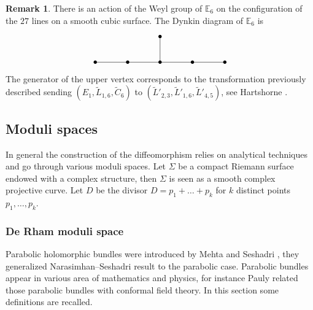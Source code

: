 \documentclass[JEP,XML,SOM,NoEqCountersInSection,Unicode,published]{cedram}
\theoremstyle{definition}
\newtheorem{remark}[definition]{Remark}
\theoremstyle{plain}
\begin{document}
\begin{remark}
There is an action of the Weyl group of $\mathbb{E}_6$ on the configuration of the $27$ lines on a smooth cubic surface. The Dynkin diagram of $\mathbb{E}_6$ is
\[\begin{tikzcd}[scale=.8]
	&& \bullet \\
	\bullet & \bullet & \bullet & \bullet & \bullet
	\arrow[no head, from=2-1, to=2-2, start anchor=center, end anchor = center ]
	\arrow[no head, from=2-3, to=2-4,start anchor=center, end anchor = center ]
	\arrow[no head, from=2-4, to=2-5,start anchor=center, end anchor = center ]
	\arrow[no head, from=1-3, to=2-3,start anchor=center, end anchor = center ]
	\arrow[no head, from=2-2, to=2-3,start anchor=center, end anchor = center ]
\end{tikzcd}
\]
The generator of the upper vertex corresponds to the transformation previously described sending $(E_1, \widetilde{L}_{1,6},\widetilde{C}_6) $ to $(\widetilde{L}'_{2,3},\widetilde{L}'_{1,6},\widetilde{L}'_{4,5})$, see Hartshorne \cite[V, Exer.\,4.11]{Hartshorne}.
\end{remark}

\subsection{Moduli spaces}\label{sect_moduli_spaces}

In general the construction of the diffeomorphism relies on analytical techniques and go through various moduli spaces. Let $\Sigma$ be a compact Riemann surface endowed with a complex structure, then $\Sigma$ is seen as a smooth complex projective curve. Let $D$ be the divisor $D=p_1+\dots +p_k$ for $k$ distinct points $p_1,\dots,p_k$.

\subsubsection{De Rham moduli space}\label{subsect_dR_alg}
Parabolic holomorphic bundles were introduced by Mehta and Seshadri \cite{Mehta_Seshadri}, they generalized Narasimhan--Seshadri \cite{Narasimhan_Seshadri} result to the parabolic case. Parabolic bundles appear in various area of mathematics and physics, for instance Pauly \cite{Pauly} related those parabolic bundles with conformal field theory. In this section some definitions are recalled.
\end{document}

